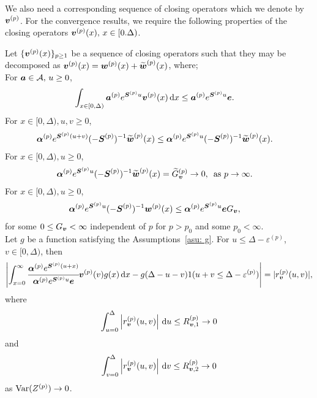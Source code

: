 We also need a corresponding sequence of closing operators which we denote by \({\boldsymbol v}^{(p)}\). For the convergence results, we require the following properties of the closing operators \({\boldsymbol v}^{(p)}(x),\, x \in[0.\Delta)\).
\begin{property}\label{properties: some props}
	Let \(\{\boldsymbol v^{(p)}(x)\}_{p\geq 1}\) be a sequence of closing operators such that they may be decomposed as \(\boldsymbol v^{(p)}(x)=\boldsymbol w^{(p)}(x) + \widetilde{\boldsymbol w}^{(p)}(x)\), where; \\
	\subproperty \label{properties: -2} For \(\boldsymbol a \in\mathcal A,\,u\geq 0\),  
        \begin{align*}
        		\int_{x\in[0,\Delta)}\boldsymbol a^{(p)} e^{\boldsymbol S^{(p)}u} {\boldsymbol v}^{(p)}(x) \, \mathrm{d} x&\leq \boldsymbol a^{(p)} e^{\boldsymbol S^{(p)}u} \boldsymbol e.
		\end{align*}
	\subproperty \label{properties: -1} For \(x\in[0,\Delta),u,v\geq 0\),  
        \begin{align*}
        		\boldsymbol \alpha^{(p)} e^{\boldsymbol S^{(p)}(u+v)}(-\boldsymbol S^{(p)})^{-1} \widetilde{\boldsymbol w}^{(p)}(x) &\leq \boldsymbol \alpha^{(p)} e^{\boldsymbol S^{(p)}u}(-\boldsymbol S^{(p)})^{-1} \widetilde{\boldsymbol w}^{(p)}(x).
		\end{align*}
	\subproperty \label{properties: 0} For \(x\in[0,\Delta),u\geq 0\),
		\begin{align*}
			\boldsymbol \alpha^{(p)} e^{\boldsymbol S^{(p)}u}(-\boldsymbol S^{(p)})^{-1} \widetilde{\boldsymbol w}^{(p)}(x) &=\widetilde G_{\boldsymbol v}^{(p)} \to 0,\, \mbox{ as }p \to \infty.  
		\end{align*}
	\subproperty \label{properties: 1} For \(x\in[0,\Delta),u\geq 0\),  
        \begin{align*}
        		\boldsymbol \alpha^{(p)} e^{\boldsymbol S^{(p)}u}(-\boldsymbol S^{(p)})^{-1} \boldsymbol w^{(p)}(x) &\leq \boldsymbol \alpha^{(p)} e^{\boldsymbol S^{(p)}u} \boldsymbol e G_{\boldsymbol v},
	\end{align*}
	for some \(0\leq G_{\boldsymbol v}<\infty\) independent of \(p\) for \(p>p_0\) and some \(p_0<\infty\). \\
	\subproperty \label{properties: 2} Let \(g\) be a function satisfying the Assumptions~\ref{asu: g}. For \(u\leq \Delta-\varepsilon^{(p)}\), \(v\in[0,\Delta)\), then
	\[\left|\int_{x=0}^\infty \cfrac{\boldsymbol \alpha^{(p)} e^{\boldsymbol{S}^{(p)}(u+x)} }{\boldsymbol \alpha^{(p)} e^{\boldsymbol{S}^{(p)}u} \boldsymbol e} {\boldsymbol v}^{(p)}(v)g(x)\, \mathrm{d} x -g(\Delta-u-v) 1(u+v\leq\Delta-\varepsilon^{(p)})\right| =  |r_{\boldsymbol v}^{(p)}(u,v)|,\]
	where 
	\[ \int_{u=0}^{\Delta}\left| r_{\boldsymbol v}^{(p)}(u,v)\right| \, \mathrm{d} u  \leq R_{{\boldsymbol v},1}^{(p)} \to 0\]
	and 
	\[ \int_{v=0}^{\Delta}\left| r_{\boldsymbol v}^{(p)}(u,v)\right| \, \mathrm{d} v  \leq R_{{\boldsymbol v},2}^{(p)} \to 0\]
	as \(\mathrm{Var}(Z^{(p)})\to 0\). 
\end{property}

